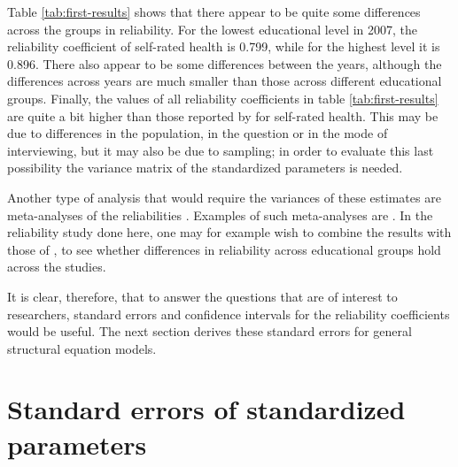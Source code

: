 \documentclass[a4paper,11pt]{article}
\newcommand{\0}{\boldsymbol{0}}
\begin{document}
Table \ref{tab:first-results} shows that there appear to be quite some differences across the groups in reliability. 
For the lowest educational level in 2007, the reliability coefficient of self-rated health is 0.799, while for the highest level it is 0.896.
There also appear to be some differences between the years, although the differences across years are much smaller than those across
different educational groups. Finally, the values of all reliability coefficients in table \ref{tab:first-results} are quite a bit higher than those reported by \cite{lundberg1996assessing} 
for self-rated health. This may be due to differences in the population, in the question or in the mode of interviewing, but it may also be due to sampling; in order to evaluate this last possibility the variance matrix of the standardized parameters is needed. 

Another type of analysis that would require the variances of these estimates are meta-analyses of the reliabilities \citep[261, 271-2]{cooper2009handbook}. Examples of such meta-analyses are 
\cite{andrews_construct_1984,scherpenzeel_validity_1997,saris_estimation_2007,alwin_margins_2007}. In the reliability study done 
here, one may for example wish to combine the results with those of \cite{lundberg1996assessing}, to see whether differences in 
reliability across educational groups hold across the studies.

It is clear, therefore, that to answer the questions that are of interest to  researchers, standard errors and confidence intervals for the 
reliability coefficients would be useful. The next section derives these standard errors for general structural equation models. 

\section{Standard errors of standardized parameters}
\end{document}
